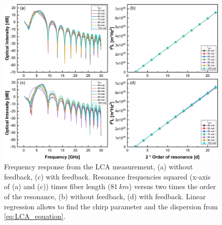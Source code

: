 \begin{figure}[H]
    \centering
    \includegraphics[width=\linewidth]{figures/chirp_cleaved_and_lensed_4679.png}
    \caption{Frequency response from the LCA measurement, (a) without feedback, (c) with feedback. Resonance frequencies squared (x-axis of (a) and (c)) times fiber length ($81 \ km$) versus two times the order of the resonance, (b) without feedback, (d) with feedback. Linear regression allows to find the chirp parameter and the dispersion from \autoref{eq:LCA_equation}.}
    \label{fig:chirp_cleaved_and_lensed}
\end{figure}

